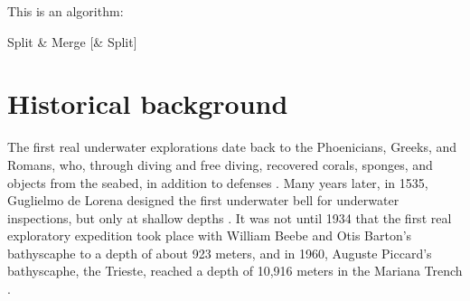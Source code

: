 This is an algorithm:
\begin{algorithm}
\label{alg:SMS}
\caption{Split \& Merge [\& Split]}
\begin{algorithmic} [1]
\ELSE
{}
\ENDIF
\ENDWHILE
{}
\end{algorithmic}
\end{algorithm}


\section{Historical background}
The first real underwater explorations date back to the Phoenicians, Greeks, and Romans, who, through diving and free diving, recovered corals, sponges, and objects from the seabed, in addition to defenses \cite{erodotoStorieVsec.a.C.}.
Many years later, in 1535, Guglielmo de Lorena designed the first underwater bell for underwater inspections, but only at shallow depths \cite{eliavGuglielmosSecretEnigma2015}.
It was not until 1934 that the first real exploratory expedition took place with William Beebe and Otis Barton's bathyscaphe to a depth of about 923 meters, and in 1960, Auguste Piccard's bathyscaphe, the Trieste, reached a depth of 10,916 meters in the Mariana Trench \cite{jacquespiccardSevenMiles}.\\


